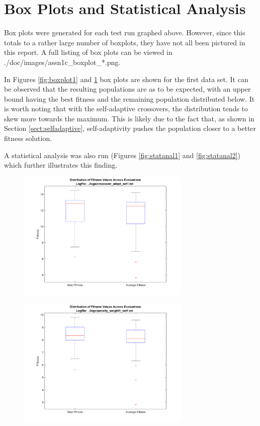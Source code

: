 \documentclass[11pt]{article}
\begin{document}
\section{Box Plots and Statistical Analysis}\label{sect:boxesandstats}

Box plots were generated for each test run graphed above. However, since this totals to a rather large number of boxplots, they have not all been pictured in this report. A full listing of box plots can be viewed in ./doc/images/assn1c\_boxplot\_*.png.

In Figures \ref{fig:boxplot1} and \ref{fig:boxplot2} box plots are shown for the first data set. It can be observed that the resulting populations are as to be expected, with an upper bound having the best fitness and the remaining population distributed below. It is worth noting that with the self-adaptive crossovers, the distribution tends to skew more towards the maximum. This is likely due to the fact that, as shown in Section \ref{sect:selfadaptive}, self-adaptivity pushes the population closer to a better fitness solution.

A statistical analysis was also run (Figures \ref{fig:statanal1} and \ref{fig:statanal2}) which further illustrates this finding.

\begin{figure}[h]
\begin{minipage}{.5\textwidth}
  \includegraphics[width=3.25in]{assn1c_boxplot_crossover_adapt_set1.png}
  \label{fig:boxplot1}
\end{minipage}%
\begin{minipage}{.5\textwidth}
  \includegraphics[width=3.25in]{assn1c_boxplot_penalty_weight1_set1.png}
  \label{fig:boxplot2}
\end{minipage}
\end{figure}
\end{document}
